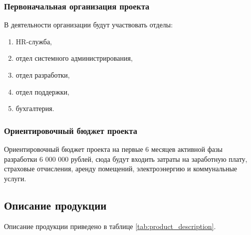 \documentclass[../main]{subfiles}
\begin{document}
\subsubsection{Первоначальная организация проекта}
В деятельности организации будут участвовать отделы:
\begin{enumerate}
    \item HR-служба,
    \item отдел системного администрирования,
    \item отдел разработки,
    \item отдел поддержки,
    \item бухгалтерия.
\end{enumerate}

\subsubsection{Ориентировочный бюджет проекта}
Ориентировочный бюджет проекта на первые 6 месяцев активной фазы разработки 6 000 000 рублей, сюда будут входить затраты на заработную плату, страховые отчисления, аренду помещений, электроэнергию и коммунальные услуги.

\subsection{Описание продукции}
Описание продукции приведено в таблице \ref{tab:product_description}.
\end{document}

